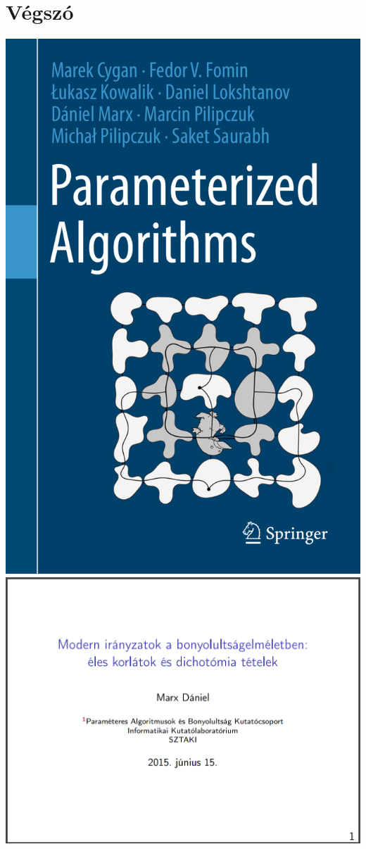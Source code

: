 \documentclass[aspectratio=169]{beamer}
\begin{document}
\section{Végszó}
\begin{frame}
\begin{center}
\includegraphics[height=0.8\textheight]{book.png}
\includegraphics[height=0.8\textheight]{slides.png}

\end{center}
\end{frame}
\end{document}

